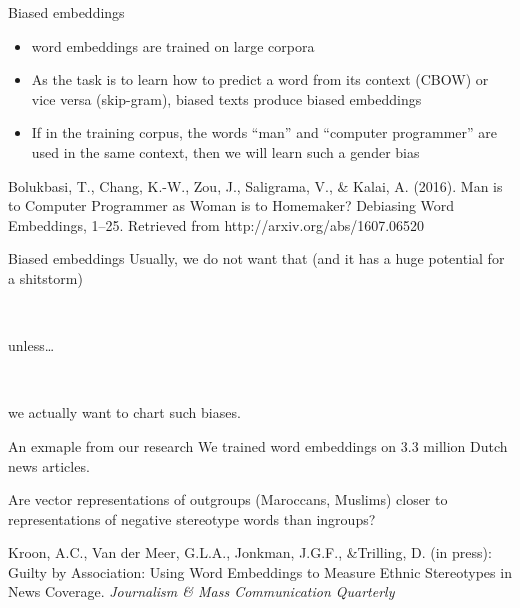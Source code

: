 \documentclass{beamer}
\begin{document}
\begin{frame}{Biased embeddings}
\begin{itemize}
	\item word embeddings are trained on large corpora
	\item As the task is to learn how to predict a word from its context (CBOW) or vice versa (skip-gram), biased texts produce biased embeddings
	\item If in the training corpus, the words ``man'' and ``computer programmer'' are used in the same context, then we will learn such a gender bias
\end{itemize}

\tiny{Bolukbasi, T., Chang, K.-W., Zou, J., Saligrama, V., \& Kalai, A. (2016). Man is to Computer Programmer as Woman is to Homemaker? Debiasing Word Embeddings, 1–25. Retrieved from http://arxiv.org/abs/1607.06520}
\end{frame}


\begin{frame}{Biased embeddings}
Usually, we do not want that (and it has a huge potential for a shitstorm)

~\\
\pause

unless\ldots

~\\
\pause

we actually want to chart such biases.

\end{frame}


\begin{frame}{An exmaple from our research}
We trained word embeddings on 3.3 million Dutch news articles.

Are vector representations of outgroups (Maroccans, Muslims) closer to representations of negative stereotype words than ingroups?
\vspace{.5cm}

\tiny{Kroon, A.C., Van der Meer, G.L.A., Jonkman, J.G.F., \&Trilling, D. (in press): Guilty by Association: Using Word Embeddings to Measure Ethnic Stereotypes in News Coverage. \emph{Journalism \& Mass
Communication Quarterly}}
\end{frame}
\end{document}
